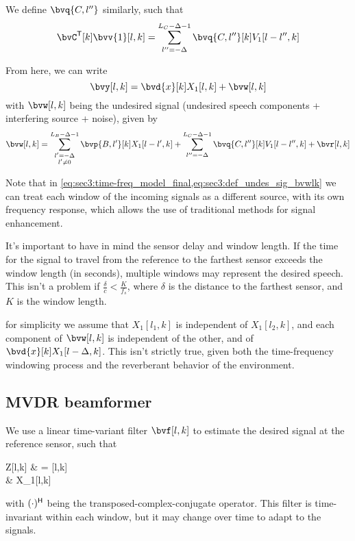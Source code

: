 We define $\bvq{C,l''}$ similarly, such that
\begin{equation}
	\tr{\bvC}[k] \bvv{1}[l,k] = \sum_{l''=-\Delta}^{L_C-\Delta-1} \bvq{C,l''}[k] V_1[l-l'',k]
\end{equation}

From here, we can write
\begin{equation}
    \label{eq:sec3:time-freq_model_final}
	\bvy[l,k] = \bvd{x}[k] X_1[l,k] + \bvw[l,k]
\end{equation}
with $\bvw[l,k]$ being the undesired signal (undesired speech components + interfering source + noise), given by
\begin{equation}
    \label{eq:sec3:def_undes_sig_bvwlk}
	\bvw[l,k] = \sum_{\substack{l'=-\Delta \\ l' \neq 0}}^{L_B-\Delta-1} \bvp{B,l'}[k] X_1[l-l',k] + \sum_{l''=-\Delta}^{L_C-\Delta-1}\bvq{C,l''}[k] V_1[l-l'',k] + \bvr[l,k]
\end{equation}

Note that in \cref{eq:sec3:time-freq_model_final,eq:sec3:def_undes_sig_bvwlk} we can treat each window of the incoming signals as a different source, with its own frequency response, which allows the use of traditional methods for signal enhancement.

It's important to have in mind the sensor delay and window length. If the time for the signal to travel from the reference to the farthest sensor exceeds the window length (in seconds), multiple windows may represent the desired speech. This isn't a problem if $\frac{\delta}{c} < \frac{K}{f_s}$, where $\delta$ is the distance to the farthest sensor, and $K$ is the window length.

for simplicity we assume that $X_1[l_1,k]$ is independent of $X_1[l_2,k]$, and each component of $\bvw[l,k]$ is independent of the other, and of $\bvd{x}[k] X_1[l-\Delta,k]$. This isn't strictly true, given both the time-frequency windowing process and the reverberant behavior of the environment.

\subsection{MVDR beamformer}

We use a linear time-variant filter $\bvf[l,k]$ to estimate the desired signal at the reference sensor, such that
\begin{equations}
	Z[l,k]
	& = \he{\bvf}[l,k] \bvy[l,k] \\
	& \approx X_1[l,k]
\end{equations}
with $(\cdot)^{\mathsf{H}}$ being the transposed-complex-conjugate operator. This filter is time-invariant within each window, but it may change over time to adapt to the signals.

